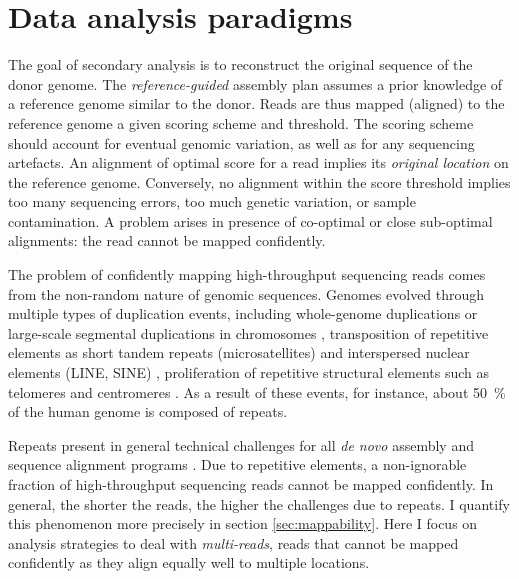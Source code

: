 
\section{Data analysis paradigms}
\label{sec:paradigms}

The goal of secondary analysis is to reconstruct the original sequence of the donor genome.
The \emph{reference-guided} assembly plan assumes a prior knowledge of a reference genome similar to the donor.
Reads are thus mapped (\ie aligned) to the reference genome \wrt a given scoring scheme and threshold.
The scoring scheme should account for eventual genomic variation, as well as for any sequencing artefacts.
An alignment of optimal score for a read implies its \emph{original location} on the reference genome.
Conversely, no alignment within the score threshold implies too many sequencing errors, too much genetic variation, or sample contamination.
A problem arises in presence of co-optimal or close sub-optimal alignments: the read cannot be mapped confidently.

The problem of confidently mapping high-throughput sequencing reads comes from the non-random nature of genomic sequences.
Genomes evolved through multiple types of duplication events, including whole-genome duplications \citep{Wolfe1997,Dehal2005} or large-scale segmental duplications in chromosomes \citep{Bailey2001,Samonte2002}, transposition of repetitive elements as short tandem repeats (microsatellites) \citep{Wang1994a,Wooster1994} and interspersed nuclear elements (LINE, SINE) \citep{Smit1996}, proliferation of repetitive structural elements such as telomeres and centromeres \citep{Meyne1990}.
As a result of these events, for instance, about 50~\% of the human genome is composed of repeats.

Repeats present in general technical challenges for all \emph{de novo} assembly and sequence alignment programs \citep{Treangen2011}.
Due to repetitive elements, a non-ignorable fraction of high-throughput sequencing reads cannot be mapped confidently.
In general, the shorter the reads, the higher the challenges due to repeats.
I quantify this phenomenon more precisely in section \ref{sec:mappability}.
Here I focus on analysis strategies to deal with \emph{multi-reads}, \ie reads that cannot be mapped confidently as they align equally well to multiple locations.

